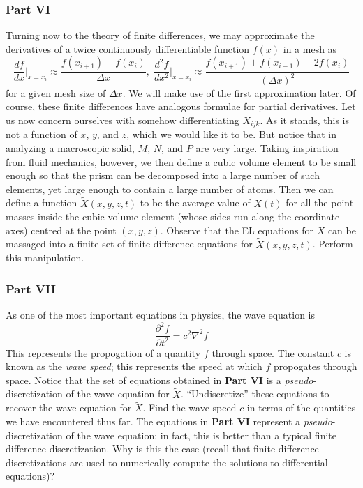 \documentclass[letterpaper,12pt]{article}
\newcommand*{\deriv}[2]{\frac{d #1}{d #2}}
\newcommand*{\nderiv}[3]{\frac{d^{#3} #1}{d #2^{#3}}}
\newcommand*{\npderiv}[3]{\frac{\partial^{#3} #1}{\partial #2^{#3}}}
\begin{document}
\begin{flushleft}
    \subsubsection*{Part VI}
    Turning now to the theory of finite differences, we may approximate the derivatives of a twice continuously differentiable function $f(x)$ in a mesh as
    $$\deriv{f}{x}\bigg|_{x=x_i} \approx \frac{f(x_{i+1}) - f(x_i)}{\Delta x}, \; \nderiv{f}{x}{2}\bigg|_{x=x_i} \approx \frac{f(x_{i+1}) + f(x_{i-1}) - 2f(x_i)}{\left(\Delta x\right)^2}$$
    for a given mesh size of $\Delta x$. We will make use of the first approximation later. Of course, these finite differences have analogous formulae for partial derivatives.\newline\newline
    Let us now concern ourselves with somehow differentiating $X_{ijk}$. As it stands, this is not a function of $x$, $y$, and $z$, which we would like it to be. But notice that in analyzing a macroscopic solid, $M$, $N$, and $P$ are very large. Taking inspiration from fluid mechanics, however, we then define a cubic volume element to be small enough so that the prism can be decomposed into a large number of such elements, yet large enough to contain a large number of atoms. Then we can define a function $\tilde{X}(x, y, z, t)$ to be the average value of $X(t)$ for all the point masses inside the cubic volume element (whose sides run along the coordinate axes) centred at the point $(x, y, z)$.\newline\newline
    Observe that the EL equations for $X$ can be massaged into a finite set of finite difference equations for $\tilde{X}(x, y, z, t)$. Perform this manipulation.

    \subsubsection*{Part VII}
    As one of the most important equations in physics, the wave equation is
    $$\npderiv{f}{t}{2} = c^2 \nabla^2 f$$
    This represents the propogation of a quantity $f$ through space. The constant $c$ is known as the \textit{wave speed}; this represents the speed at which $f$ propogates through space. Notice that the set of equations obtained in \textbf{Part VI} is a \textit{pseudo}-discretization of the wave equation for $\tilde{X}$.\newline\newline
    ``Undiscretize'' these equations to recover the wave equation for $\tilde{X}$. Find the wave speed $c$ in terms of the quantities we have encountered thus far. The equations in \textbf{Part VI} represent a \textit{pseudo}-discretization of the wave equation; in fact, this is better than a typical finite difference discretization. Why is this the case (recall that finite difference discretizations are used to numerically compute the solutions to differential equations)?


\end{flushleft}
\end{document}
